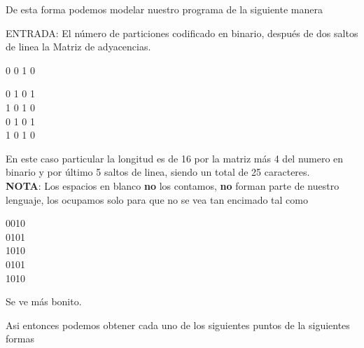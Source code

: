 \documentclass[12pt,letterpaper]{article}
\begin{document}




\newpage
De esta forma podemos modelar nuestro programa de la siguiente manera

ENTRADA: El número de particiones codificado en binario, después de dos saltos de linea la Matriz de adyacencias.

\begin{center}
 0 0 1 0
 
 
 0 1 0 1 \\
 1 0 1 0\\
 0 1 0 1\\
 1 0 1 0 \\
\end{center}

En este caso particular la longitud es de 16 por la matriz más 4 del numero en binario y por último 5 saltos de linea, siendo un total de 25 caracteres.\\

\textbf{NOTA}: Los espacios en blanco \textbf{no} los contamos, \textbf{no} forman parte de nuestro lenguaje, los ocupamos solo para que no se vea tan encimado tal como
\begin{center}
 0010\\
 0101\\
 1010\\
 0101\\
 1010\\
\end{center}
Se ve más bonito.

Asi entonces podemos obtener cada uno de los siguientes puntos de la siguientes formas
\end{document}
